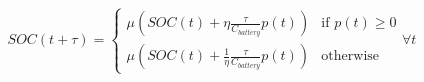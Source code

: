 \begin{equation}
	SOC(t+\tau) =
	\begin{cases}
		\mu \left(SOC(t) + \eta \frac{\tau}{C_{battery}}p(t)\right) &\text{if } p(t) \geq 0\\
		\mu \left(SOC(t) + \frac{1}{\eta} \frac{\tau}{C_{battery}}p(t)\right) &\text{otherwise}
	\end{cases}
	\forall t
	\label{ch2:equ:battery-model-equation}
\end{equation}